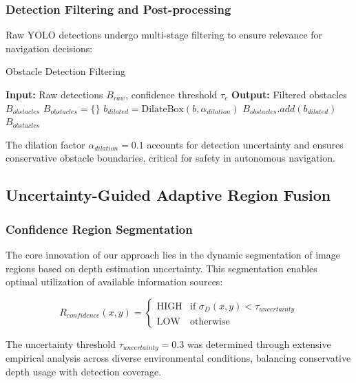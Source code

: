 \documentclass[10pt]{article}
\begin{document}
\subsubsection{Detection Filtering and Post-processing}

Raw YOLO detections undergo multi-stage filtering to ensure relevance for navigation decisions:

\begin{algorithm}
\caption{Obstacle Detection Filtering}
\begin{algorithmic}
\STATE \textbf{Input:} Raw detections $B_{raw}$, confidence threshold $\tau_c$
\STATE \textbf{Output:} Filtered obstacles $B_{obstacles}$
\STATE $B_{obstacles} = \{\}$
        \STATE $b_{dilated} = \text{DilateBox}(b, \alpha_{dilation})$
        \STATE $B_{obstacles}.add(b_{dilated})$
    \ENDIF
\ENDFOR
\RETURN $B_{obstacles}$
\end{algorithmic}
\end{algorithm}

The dilation factor $\alpha_{dilation} = 0.1$ accounts for detection uncertainty and ensures conservative obstacle boundaries, critical for safety in autonomous navigation.

\subsection{Uncertainty-Guided Adaptive Region Fusion}

\subsubsection{Confidence Region Segmentation}

The core innovation of our approach lies in the dynamic segmentation of image regions based on depth estimation uncertainty. This segmentation enables optimal utilization of available information sources:

\begin{equation}
R_{confidence}(x,y) = \begin{cases}
\text{HIGH} & \text{if } \sigma_D(x,y) < \tau_{uncertainty} \\
\text{LOW} & \text{otherwise}
\end{cases}
\label{eq:confidence_segmentation}
\end{equation}

The uncertainty threshold $\tau_{uncertainty} = 0.3$ was determined through extensive empirical analysis across diverse environmental conditions, balancing conservative depth usage with detection coverage.
\end{document}
